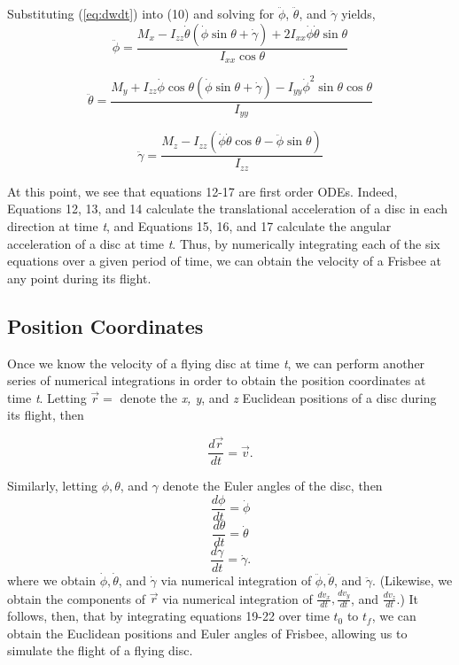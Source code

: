 \documentclass[a4paper,12pt, oneside]{article}
\begin{document}
Substituting (\ref{eq:dwdt}) into (10) and solving for $\ddot\phi$, $\ddot\theta$, and $\ddot\gamma$ yields,
\begin{equation}
\ddot\phi=\frac{M_x-I_{zz}\dot\theta(\dot\phi\sin\theta+\dot\gamma)+2I_{xx}\dot\phi\dot\theta\sin\theta}{I_{xx}\cos\theta}
\end{equation}

\begin{equation}
\ddot\theta=\frac{M_y+I_{zz}\dot\phi\cos\theta(\dot\phi\sin\theta+\dot\gamma)-I_{yy}\dot\phi^2\sin\theta\cos\theta} {I_{yy}}
\end{equation}

\begin{equation}
\ddot\gamma=\frac{M_z-I_{zz}(\dot\phi\dot\theta\cos\theta-\ddot\phi\sin\theta)}{I_{zz}}
\end{equation}

At this point, we see that equations 12-17 are first order ODEs. Indeed, Equations 12, 13, and 14 calculate the translational acceleration of a disc in each direction at time \textit{t}, and Equations 15, 16, and 17 calculate the angular acceleration of a disc at time \textit{t}. Thus, by numerically integrating each of the six equations over a given period of time, we can obtain the velocity of a Frisbee at any point during its flight.

\subsection{Position Coordinates}
\color{BurntOrange}
Once we know the velocity of a flying disc at time \textit{t}, we can perform another series of numerical integrations in order to obtain the position coordinates at time \textit{t}. Letting $\vec{r}=$ denote the \textit{x, y}, and \textit{z} Euclidean positions of a disc during its flight, then 

\begin{equation}
  \label{eq:position_deriv}
  \frac{d\vec{r}}{dt} = \vec{v}.
\end{equation}

Similarly, letting $\phi, \theta$, and $\gamma$ denote the Euler angles of the disc, then
\begin{equation}
\frac{d\phi}{dt}=\dot\phi
\end{equation}
\begin{equation}
\frac{d\theta}{dt}=\dot\theta
\end{equation}
\begin{equation}
\frac{d\gamma}{dt}=\dot\gamma.
\end{equation}
where we obtain $\dot\phi, \dot\theta$, and $\dot\gamma$ via numerical integration of $\ddot\phi, \ddot\theta$, and $\ddot\gamma$. (Likewise, we obtain the components of $\vec{r}$ via numerical integration of $\frac{{dv}_x}{dt}, \frac{{dv}_y}{dt}$, and $\frac{{dv}_z}{dt}$.) It follows, then, that by integrating equations 19-22 over time $t_0$ to $t_f$, we can obtain the Euclidean positions and Euler angles of Frisbee, allowing us to simulate the flight of a flying disc. 
\end{document}
